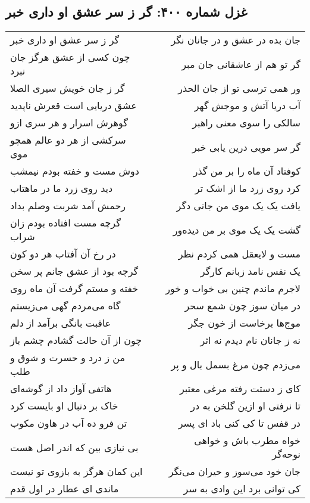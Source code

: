 \begin{center}
\section*{غزل شماره ۴۰۰: گر ز سر عشق او داری خبر}
\label{sec:400}
\begin{longtable}{l p{0.5cm} r}
گر ز سر عشق او داری خبر
&&
جان بده در عشق و در جانان نگر
\\
چون کسی از عشق هرگز جان نبرد
&&
گر تو هم از عاشقانی جان مبر
\\
گر ز جان خویش سیری الصلا
&&
ور همی ترسی تو از جان الحذر
\\
عشق دریایی است قعرش ناپدید
&&
آب دریا آتش و موجش گهر
\\
گوهرش اسرار و هر سری ازو
&&
سالکی را سوی معنی راهبر
\\
سرکشی از هر دو عالم همچو موی
&&
گر سر مویی درین یابی خبر
\\
دوش مست و خفته بودم نیمشب
&&
کوفتاد آن ماه را بر من گذر
\\
دید روی زرد ما در ماهتاب
&&
کرد روی زرد ما از اشک تر
\\
رحمش آمد شربت وصلم بداد
&&
یافت یک یک موی من جانی دگر
\\
گرچه مست افتاده بودم زان شراب
&&
گشت یک یک موی بر من دیده‌ور
\\
در رخ آن آفتاب هر دو کون
&&
مست و لایعقل همی کردم نظر
\\
گرچه بود از عشق جانم پر سخن
&&
یک نفس نامد زبانم کارگر
\\
خفته و مستم گرفت آن ماه روی
&&
لاجرم ماندم چنین بی خواب و خور
\\
گاه می‌مردم گهی می‌زیستم
&&
در میان سوز چون شمع سحر
\\
عاقبت بانگی برآمد از دلم
&&
موج‌ها برخاست از خون جگر
\\
چون از آن حالت گشادم چشم باز
&&
نه ز جانان نام دیدم نه اثر
\\
من ز درد و حسرت و شوق و طلب
&&
می‌زدم چون مرغ بسمل بال و پر
\\
هاتفی آواز داد از گوشه‌ای
&&
کای ز دستت رفته مرغی معتبر
\\
خاک بر دنبال او بایست کرد
&&
تا نرفتی او ازین گلخن به در
\\
تن فرو ده آب در هاون مکوب
&&
در قفس تا کی کنی باد ای پسر
\\
بی نیازی بین که اندر اصل هست
&&
خواه مطرب باش و خواهی نوحه‌گر
\\
این کمان هرگز به بازوی تو نیست
&&
جان خود می‌سوز و حیران می‌نگر
\\
ماندی ای عطار در اول قدم
&&
کی توانی برد این وادی به سر
\\
\end{longtable}
\end{center}
